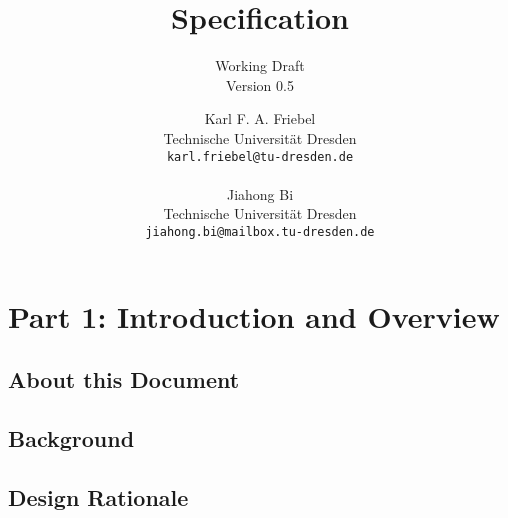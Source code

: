 \documentclass[draft]{scrspec}
\begin{document}
\title{\basetwo Specification}
\subtitle{Working Draft\\Version 0.5}

\author{
    Karl F. A. Friebel \\
    Technische Universität Dresden \\
    \texttt{karl.friebel@tu-dresden.de} \\
    \\
    Jiahong Bi \\
    Technische Universität Dresden \\
    \texttt{jiahong.bi@mailbox.tu-dresden.de} \\
    \vspace{20em}
}

\maketitle

\begin{versionhistory}
\end{versionhistory}

\newpage
{}
\tableofcontents

%
%

\part{Part 1: Introduction and Overview}

\chapter{About this Document}


\chapter{Background}


\chapter{Design Rationale}

\end{document}
